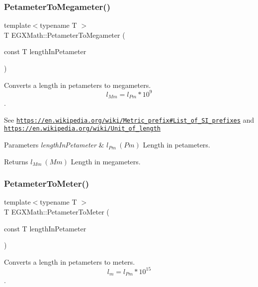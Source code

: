 \subsubsection{\texorpdfstring{Petameter\+To\+Megameter()}{PetameterToMegameter()}}
{\footnotesize\ttfamily template$<$typename T $>$ \\
T E\+G\+X\+Math\+::\+Petameter\+To\+Megameter (\begin{DoxyParamCaption}\item[{const T}]{length\+In\+Petameter }\end{DoxyParamCaption})}



Converts a length in petameters to megameters. \[ l_{Mm}=l_{Pm} * 10^{9} \]. 

See \href{https://en.wikipedia.org/wiki/Metric_prefix#List_of_SI_prefixes}{\tt https\+://en.\+wikipedia.\+org/wiki/\+Metric\+\_\+prefix\#\+List\+\_\+of\+\_\+\+S\+I\+\_\+prefixes} and \href{https://en.wikipedia.org/wiki/Unit_of_length}{\tt https\+://en.\+wikipedia.\+org/wiki/\+Unit\+\_\+of\+\_\+length} 
\begin{DoxyParams}{Parameters}
{\em length\+In\+Petameter} & $ l_{Pm}\ (Pm)$ Length in petameters. \\
\hline
\end{DoxyParams}
\begin{DoxyReturn}{Returns}
$ l_{Mm}\ (Mm)$ Length in megameters. 
\end{DoxyReturn}
\mbox{\label{group___e_g_x_math-_conversions-_length_conversions-_petameter-_s_i_ga604a637d8bd107a2eaa162757b2e813b}} 
\subsubsection{\texorpdfstring{Petameter\+To\+Meter()}{PetameterToMeter()}}
{\footnotesize\ttfamily template$<$typename T $>$ \\
T E\+G\+X\+Math\+::\+Petameter\+To\+Meter (\begin{DoxyParamCaption}\item[{const T}]{length\+In\+Petameter }\end{DoxyParamCaption})}



Converts a length in petameters to meters. \[ l_{m}=l_{Pm} * 10^{15} \]. 


